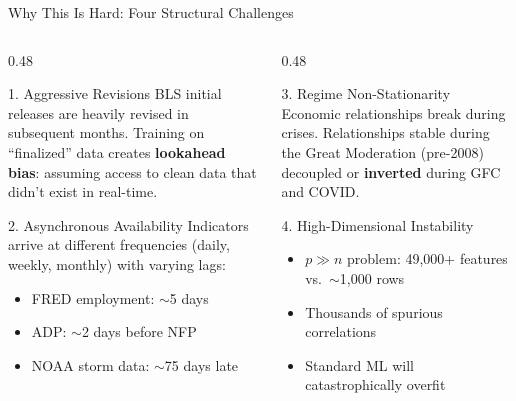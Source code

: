 \documentclass[aspectratio=169,10pt]{beamer}
\begin{document}
\begin{frame}{Why This Is Hard: Four Structural Challenges}
\begin{columns}[T]
\begin{column}{0.48\textwidth}
\begin{alertblock}{1. Aggressive Revisions}
BLS initial releases are heavily revised in subsequent months. Training on ``finalized'' data creates \textbf{lookahead bias}: assuming access to clean data that didn't exist in real-time.
\end{alertblock}

\vspace{0.2cm}
\begin{alertblock}{2. Asynchronous Availability}
Indicators arrive at different frequencies (daily, weekly, monthly) with varying lags:
\begin{itemize}
  \item FRED employment: $\sim$5 days
  \item ADP: $\sim$2 days before NFP
  \item NOAA storm data: $\sim$75 days late
\end{itemize}
\end{alertblock}
\end{column}
\begin{column}{0.48\textwidth}
\begin{alertblock}{3. Regime Non-Stationarity}
Economic relationships break during crises. Relationships stable during the Great Moderation (pre-2008) decoupled or \textbf{inverted} during GFC and COVID.
\end{alertblock}

\vspace{0.2cm}
\begin{alertblock}{4. High-Dimensional Instability}
\begin{itemize}
  \item $p \gg n$ problem: 49{,}000+ features vs.\ $\sim$1{,}000 rows
  \item Thousands of spurious correlations
  \item Standard ML will catastrophically overfit
\end{itemize}
\end{alertblock}
\end{column}
\end{columns}
\end{frame}

\end{document}
